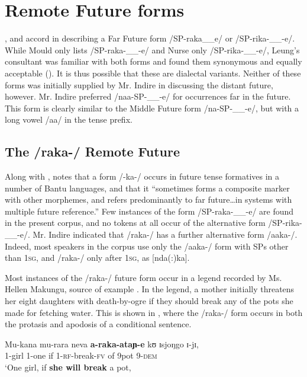 \documentclass[output=paper]{langsci/langscibook}
\begin{document}
\section[Remote Future forms]{Remote Future forms} \label{sec:sarvasy:6}
\citet{Mould1981}, \citet{Leung1991} and \citet{Nurse2003} accord in describing a Far Future %
%
form /SP-raka\_\_e/ or /SP-rika-\_\_-e/. While Mould only lists /SP-raka-\_\_-e/ and Nurse only /SP-rika-\_\_-e/, Leung’s consultant was familiar with both forms and found them synonymous and equally acceptable (\citeyear[204, fn 10]{Leung1991}). It is thus possible that these are dialectal variants. Neither of these forms was initially supplied by Mr. Indire in discussing the distant future, however. Mr. Indire preferred /naa-SP-\_\_-e/ for occurrences far in the future. This form is clearly similar to the Middle Future form /na-SP-\_\_-e/, but with a long vowel /aa/ in the tense prefix. 

\subsection{The /raka-/ Remote Future}\label{sec:sarvasy:6.1}

Along with \citet{Botne1999}, \citet[85]{Nurse2008} notes that a form /-ka-/ occurs in future tense formatives in a number of Bantu languages, and that it “sometimes forms a composite marker with other morphemes, and refers predominantly to far future\ldots in systems with multiple future reference.” Few instances of the form /SP-raka-\_\_-e/ are found in the present corpus, and no tokens at all occur of the alternative form /SP-rika-\_\_-e/. Mr. Indire indicated that /raka-/ has a further alternative form /aaka-/. Indeed, most speakers in the corpus use only the /aaka-/ form with SPs other than \textsc{1sg}, and /raka-/ only after \textsc{1sg}, as [nda(:)ka].

Most instances of the /raka-/ future form occur in a legend recorded by Ms. Hellen Makungu, source of example . In the legend, a mother initially threatens her eight daughters with death-by-ogre if they should break any of the pots she made for fetching water. This is shown in , where the /raka-/ form occurs in both the protasis and apodosis of a conditional sentence. 

\ea\label{ex:sarvasy:14}
\gll Mu-kana   mu-rara   neva   \textbf{a-raka-ataɲ-e}   kʊ     ɪsjoŋgo   ɪ-jɪ,  \\
1-girl    1-one    if  1-\textsc{rf}-break-\textsc{fv}  of  9pot   9-\textsc{dem} \\
\glt ‘One girl, if \textbf{she will break} a pot,
\end{document}
